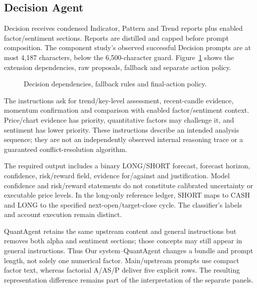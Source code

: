 \subsection{Decision Agent}
Decision receives condensed Indicator, Pattern and Trend reports plus enabled factor/sentiment sections. Reports are distilled and capped before prompt composition. The component study's observed successful Decision prompts are at most 4,187 characters, below the 6,500-character guard. Figure~\ref{fig:decision_agent} shows the extension dependencies, raw proposals, fallback and separate action policy.

\begin{figure}[!htb]
\centering
\caption{Decision dependencies, fallback rules and final-action policy.}
\label{fig:decision_agent}
\end{figure}

The instructions ask for trend/key-level assessment, recent-candle evidence, momentum confirmation and comparison with enabled factor/sentiment context. Price/chart evidence has priority, quantitative factors may challenge it, and sentiment has lower priority. These instructions describe an intended analysis sequence; they are not an independently observed internal reasoning trace or a guaranteed conflict-resolution algorithm.

The required output includes a binary LONG/SHORT forecast, forecast horizon, confidence, risk/reward field, evidence for/against and justification. Model confidence and risk/reward statements do not constitute calibrated uncertainty or executable price levels. In the long-only reference ledger, SHORT maps to CASH and LONG to the specified next-open/target-close cycle. The classifier's labels and account execution remain distinct.

QuantAgent retains the same upstream content and general instructions but removes both alpha and sentiment sections; those concepts may still appear in general instructions. Thus Our system--QuantAgent changes a bundle and prompt length, not solely one numerical factor. Main/upstream prompts use compact factor text, whereas factorial A/AS/P deliver five explicit rows. The resulting representation difference remains part of the interpretation of the separate panels.

